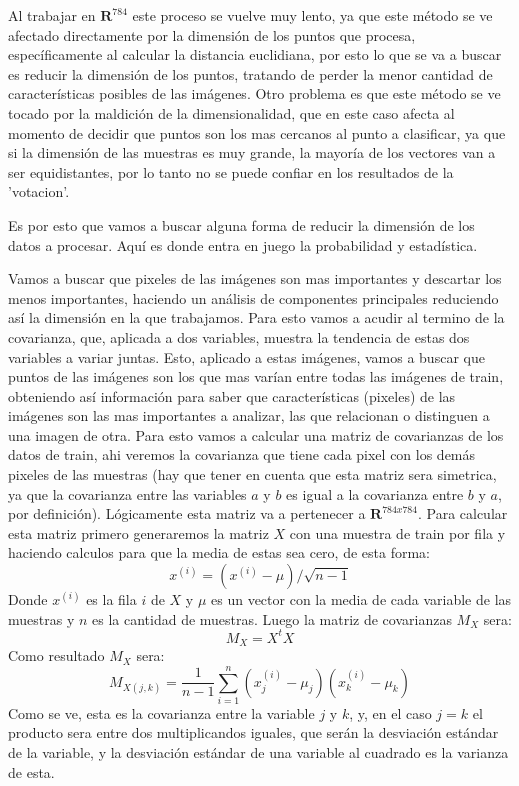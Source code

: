 \documentclass[a4paper]{article}
\begin{document}
Al trabajar en $\mathbf{R}^{784}$ este proceso se vuelve muy lento, ya que este método se ve afectado directamente por la dimensión de los puntos que procesa, específicamente al calcular la distancia euclidiana, por esto lo que se va a buscar es reducir la dimensión de los puntos, tratando de perder la menor cantidad de características posibles de las imágenes. Otro problema es que este método se ve tocado por la maldición de la dimensionalidad, que en este caso afecta al momento de decidir que puntos son los mas cercanos al punto a clasificar, ya que si la dimensión de las muestras es muy grande, la mayoría de los vectores van a ser equidistantes, por lo tanto no se puede confiar en los resultados de la 'votacion'.\par
Es por esto que vamos a buscar alguna forma de reducir la dimensión de los datos a procesar. Aquí es donde entra en juego la probabilidad y estadística.\smallbreak\par
Vamos a buscar que pixeles de las imágenes son mas importantes y descartar los menos importantes, haciendo un análisis de componentes principales reduciendo así la dimensión en la que trabajamos. Para esto vamos a acudir al termino de la covarianza, que, aplicada a dos variables, muestra la tendencia de estas dos variables a variar juntas. Esto, aplicado a estas imágenes, vamos a buscar que puntos de las imágenes son los que mas varían entre todas las imágenes de train, obteniendo así información para saber que características (pixeles) de las imágenes son las mas importantes a analizar, las que relacionan o distinguen a una imagen de otra. Para esto vamos a calcular una matriz de covarianzas de los datos de train, ahi veremos la covarianza que tiene cada pixel con los demás pixeles de las muestras (hay que tener en cuenta que esta matriz sera simetrica, ya que la covarianza entre las variables $a$ y $b$ es igual a la covarianza entre $b$ y $a$, por definición). Lógicamente esta matriz va a pertenecer a $\mathbf{R}^{784x784}$. Para calcular esta matriz primero generaremos la matriz $X$ con una muestra de train por fila y haciendo calculos para que la media de estas sea cero, de esta forma:
$$x^{(i)} = (x^{(i)}-\mu)/\sqrt{n-1}$$
Donde $x^{(i)}$ es la fila $i$ de $X$ y $\mu$ es un vector con la media de cada variable de las muestras y $n$ es la cantidad de muestras. Luego la matriz de covarianzas $M_X$ sera:
$$M_X = X^tX$$
Como resultado $M_X$ sera:
$$M_{X (j,k)} = \frac{1}{n-1}\sum_{i=1}^{n} (x_j^{(i)} - \mu_j)(x_k^{(i)} - \mu_k)$$
Como se ve, esta es la covarianza entre la variable $j$ y $k$, y, en el caso $j = k$ el producto sera entre dos multiplicandos iguales, que serán la desviación estándar de la variable, y la desviación estándar de una variable al cuadrado es la varianza de esta.
\end{document}

